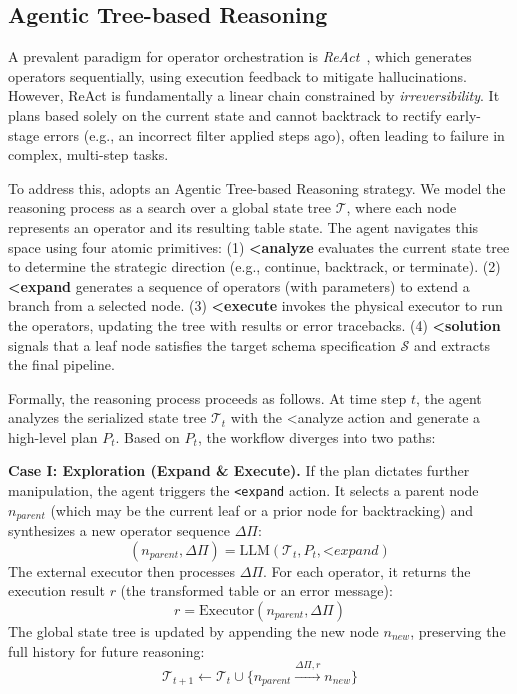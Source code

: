 \subsection{Agentic Tree-based Reasoning}


A prevalent paradigm for operator orchestration is \textit{ReAct}~\cite{aksitov2023rest}, which generates operators sequentially, using execution feedback to mitigate hallucinations. However, ReAct is fundamentally a linear chain constrained by \textit{irreversibility}. It plans based solely on the current state and cannot backtrack to rectify early-stage errors (e.g., an incorrect filter applied steps ago), often leading to failure in complex, multi-step tasks.

To address this, \sys adopts an {Agentic Tree-based Reasoning} strategy. We model the reasoning process as a search over a global state tree $\mathcal{T}$, where each node represents an operator and its resulting table state. The agent navigates this space using four atomic primitives:
(1) \textbf{<analyze} evaluates the current state tree to determine the strategic direction (e.g., continue, backtrack, or terminate).
(2) \textbf{<expand} generates a sequence of operators (with parameters) to extend a branch from a selected node.
(3) \textbf{<execute} invokes the physical executor to run the operators, updating the tree with results or error tracebacks.
(4) \textbf{<solution} signals that a leaf node satisfies the target schema specification $\mathcal{S}$ and extracts the final pipeline.


Formally, the reasoning process proceeds as follows. At time step $t$, the agent analyzes the serialized state tree $\mathcal{T}_t$ with the {<analyze} action and generate a high-level plan $P_t$. Based on $P_t$, the workflow diverges into two paths:

\noindent\textbf{Case I: Exploration (Expand \& Execute).}
If the plan dictates further manipulation, the agent triggers the \texttt{<expand} action. It selects a parent node $n_{parent}$ (which may be the current leaf or a prior node for backtracking) and synthesizes a new operator sequence $\Delta \Pi$:
\begin{equation}
    (n_{parent}, \Delta \Pi) = \text{LLM}(\mathcal{T}_t, P_t, \textit{<expand})
\end{equation}
The external executor then processes $\Delta \Pi$. For each operator, it returns the execution result $r$ (the transformed table or an error message):
\begin{equation}
    r = \text{Executor}(n_{parent}, \Delta \Pi)
\end{equation}
The global state tree is updated by appending the new node $n_{new}$, preserving the full history for future reasoning:
\begin{equation}
    \mathcal{T}_{t+1} \leftarrow \mathcal{T}_t \cup \{ n_{parent} \xrightarrow{\Delta \Pi, r} n_{new} \}
\end{equation}

